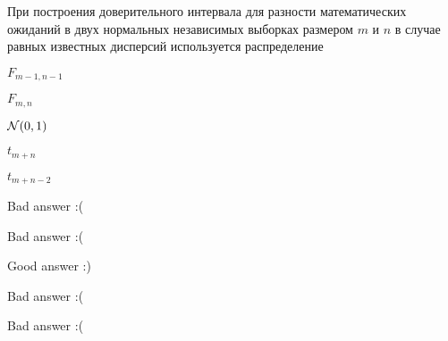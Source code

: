 
\begin{question}
При построения доверительного интервала для разности математических
ожиданий в двух нормальных независимых выборках размером \(m\) и \(n\) в
случае равных известных дисперсий используется распределение
\begin{answerlist}
  \item \(F_{m-1, n-1}\)
  \item \(F_{m,n}\)
  \item \(\mathcal{N}(0, 1)\)
  \item \(t_{m+n}\)
  \item \(t_{m+n-2}\)
\end{answerlist}
\end{question}

\begin{solution}
\begin{answerlist}
  \item Bad answer :(
  \item Bad answer :(
  \item Good answer :)
  \item Bad answer :(
  \item Bad answer :(
\end{answerlist}
\end{solution}

